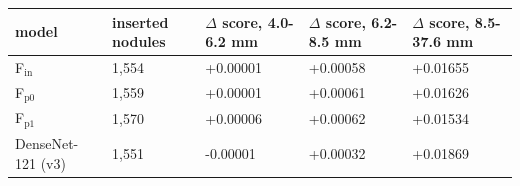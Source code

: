\begin{tabular}{lllll}
\toprule
model & inserted nodules & $\Delta$ score, 4.0-6.2 mm & $\Delta$ score, 6.2-8.5 mm & $\Delta$ score, 8.5-37.6 mm \\
\midrule
F$_\mathrm{in}$ & 1,554 & +0.00001 & +0.00058 & +0.01655 \\
F$_\mathrm{p0}$ & 1,559 & +0.00001 & +0.00061 & +0.01626 \\
F$_\mathrm{p1}$ & 1,570 & +0.00006 & +0.00062 & +0.01534 \\
DenseNet-121 (v3) & 1,551 & -0.00001 & +0.00032 & +0.01869 \\
\bottomrule
\end{tabular}
